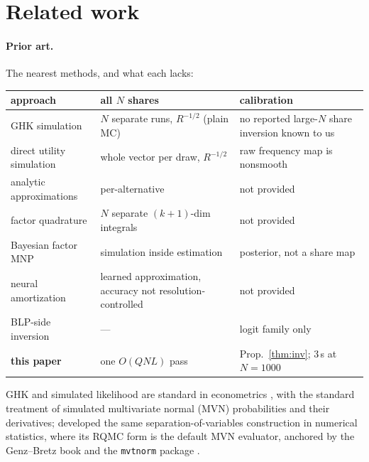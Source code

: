 \documentclass[12pt]{article}
\theoremstyle{remark}
\begin{document}
\section{Related work}\label{sec:related}

\paragraph{Prior art.} The nearest methods, and what each lacks:
\nopagebreak[4]

\begin{center}
\footnotesize
\setlength{\tabcolsep}{5pt}
\renewcommand{\arraystretch}{1.25}
\begin{tabular}{|p{4.1cm}|p{4.1cm}|p{4.5cm}|}
\hline
\textbf{approach} & \textbf{all $N$ shares} & \textbf{calibration} \\
\hline
GHK simulation \citep{geweke1994,hajivassiliou1998} & $N$ separate runs, $R^{-1/2}$ (plain MC) & no reported large-$N$ share inversion known to us \\
\hline
direct utility simulation & whole vector per draw, $R^{-1/2}$ & raw frequency map is nonsmooth \\
\hline
analytic approximations \citep{bhat2011,connors2014} & per-alternative & not provided \\
\hline
factor quadrature \citep{butler1982,elrod1995} & $N$ separate $(k{+}1)$-dim integrals & not provided \\
\hline
Bayesian factor MNP \citep{loaiza2022} & simulation inside estimation & posterior, not a share map \\
\hline
neural amortization \citep{huch2026} & learned approximation, accuracy not resolution-controlled & not provided \\
\hline
BLP-side inversion \citep{berry1995,conlon2020} & --- & logit family only \\
\hline
\textbf{this paper} & one $O(QNL)$ pass & Prop.~\ref{thm:inv}; 3\,s at $N{=}1000$ \\
\hline
\end{tabular}
\end{center}



GHK and simulated likelihood are standard in econometrics
\citep{geweke1994,hajivassiliou1998,train2009}, with
\citet{hmr1996} the standard treatment of simulated multivariate
normal (MVN) probabilities
and their derivatives; \citet{genz1992}
developed the same separation-of-variables construction in numerical
statistics, where its RQMC form is the default MVN evaluator, anchored
by the Genz--Bretz book \citep{genzbretz2009} and the \texttt{mvtnorm}
package \citep{mi2009}.
\end{document}
